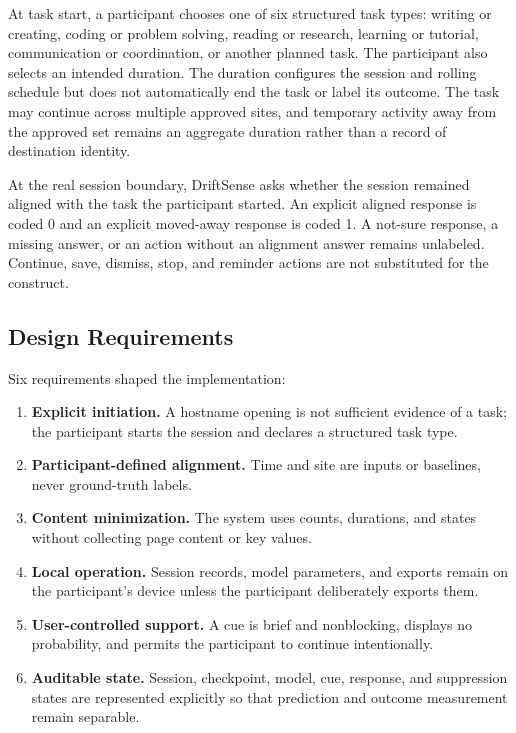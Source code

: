 \documentclass[12pt,a4paper]{article}
\begin{document}
At task start, a participant chooses one of six structured task types: writing or creating, coding or problem solving, reading or research, learning or tutorial, communication or coordination, or another planned task. The participant also selects an intended duration. The duration configures the session and rolling schedule but does not automatically end the task or label its outcome. The task may continue across multiple approved sites, and temporary activity away from the approved set remains an aggregate duration rather than a record of destination identity.

At the real session boundary, DriftSense asks whether the session remained aligned with the task the participant started. An explicit aligned response is coded 0 and an explicit moved-away response is coded 1. A not-sure response, a missing answer, or an action without an alignment answer remains unlabeled. Continue, save, dismiss, stop, and reminder actions are not substituted for the construct.

\subsection{Design Requirements}

Six requirements shaped the implementation:

\begin{enumerate}
\item \textbf{Explicit initiation.} A hostname opening is not sufficient evidence of a task; the participant starts the session and declares a structured task type.
\item \textbf{Participant-defined alignment.} Time and site are inputs or baselines, never ground-truth labels.
\item \textbf{Content minimization.} The system uses counts, durations, and states without collecting page content or key values.
\item \textbf{Local operation.} Session records, model parameters, and exports remain on the participant's device unless the participant deliberately exports them.
\item \textbf{User-controlled support.} A cue is brief and nonblocking, displays no probability, and permits the participant to continue intentionally.
\item \textbf{Auditable state.} Session, checkpoint, model, cue, response, and suppression states are represented explicitly so that prediction and outcome measurement remain separable.
\end{enumerate}
\end{document}
